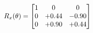 \documentclass[preview]{standalone}
\begin{document}
\begin{align*}
\special{dvisvgm:raw <g id='unique000'>}R_{x}(\theta) = \begin{bmatrix}1 & 0 & 0 \\0 & +0.44 & -0.90 \\0 & +0.90 & +0.44\end{bmatrix}\special{dvisvgm:raw </g>}
\end{align*}
\end{document}
